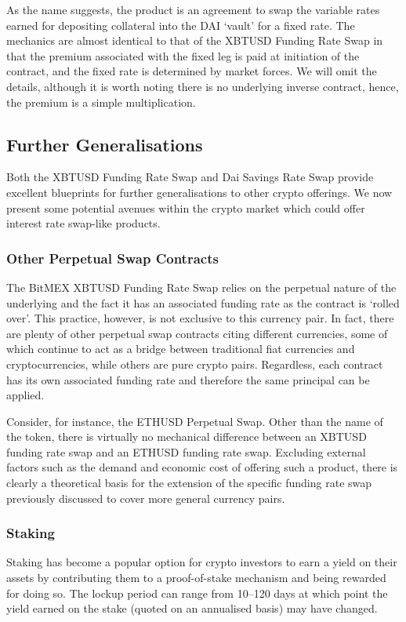As the name suggests, the product is an agreement to swap the variable rates earned for depositing collateral into the DAI `vault' for a fixed rate. The mechanics are almost identical to that of the XBTUSD Funding Rate Swap in that the premium associated with the fixed leg is paid at initiation of the contract, and the fixed rate is determined by market forces. We will omit the details, although it is worth noting there is no underlying inverse contract, hence, the premium is a simple multiplication. 

\subsection{Further Generalisations}

Both the XBTUSD Funding Rate Swap and Dai Savings Rate Swap provide excellent blueprints for further generalisations to other crypto offerings. We now present some potential avenues within the crypto market which could offer interest rate swap-like products.

\subsubsection{Other Perpetual Swap Contracts}
The BitMEX XBTUSD Funding Rate Swap relies on the perpetual nature of the underlying and the fact it has an associated funding rate as the contract is `rolled over'. This practice, however, is not exclusive to this currency pair. In fact, there are plenty of other perpetual swap contracts citing different currencies, some of which continue to act as a bridge between traditional fiat currencies and cryptocurrencies, while others are pure crypto pairs. Regardless, each contract has its own associated funding rate and therefore the same principal can be applied.

Consider, for instance, the ETHUSD Perpetual Swap. Other than the name of the token, there is virtually no mechanical difference between an XBTUSD funding rate swap and an ETHUSD funding rate swap. Excluding external factors such as the demand and economic cost of offering such a product, there is clearly a theoretical basis for the extension of the specific funding rate swap previously discussed to cover more general currency pairs. 

\subsubsection{Staking}
Staking has become a popular option for crypto investors to earn a yield on their assets by contributing them to a proof-of-stake mechanism and being rewarded for doing so. The lockup period can range from 10–120 days at which point the yield earned on the stake (quoted on an annualised basis) may have changed.

